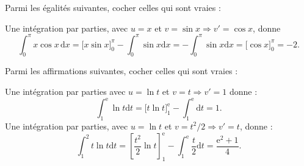 \begin{question}
Parmi les égalités suivantes, cocher celles qui sont vraies :
\begin{answers}
\end{answers}
\begin{explanations}
Une intégration par parties, avec $u=x$ et $v=\sin x\Rightarrow v'=\cos x$, donne
$$\int _0^{\pi}x\cos x\,\mathrm{d}x=\Big[x\sin x\Big]_0^{\pi}-\int _0^{\pi}\sin x\mathrm{d}x=-\int _0^{\pi}\sin x\mathrm{d}x=\Big[\cos x\Big]_0^{\pi}=-2.$$
\end{explanations}
\end{question}


\begin{question}
Parmi les affirmations suivantes, cocher celles qui sont vraies : 
\begin{answers}  
\end{answers}
\vskip2mm
\begin{explanations}
Une intégration par parties avec $u=\ln t$ et $v=t\Rightarrow v'=1$ donne :
$$\displaystyle \int _1^{\mathrm{e}}\ln t\mathrm{d}t=\Big[t\ln t\Big]_1^{\mathrm{e}}-\int _1^{\mathrm{e}}\mathrm{d}t=1.$$
Une intégration par parties, avec $u=\ln t$ et $v=t^2/2\Rightarrow v'=t$, donne :
$$\displaystyle \int _1^{2}t\ln t\mathrm{d}t=\left[\frac{t^2}{2}\ln t\right]_1^{\mathrm{e}}-\int _1^{\mathrm{e}}\frac{t}{2}\mathrm{d}t=\frac{\mathrm{e}^2+1}{4}.$$
\end{explanations}
\end{question}


